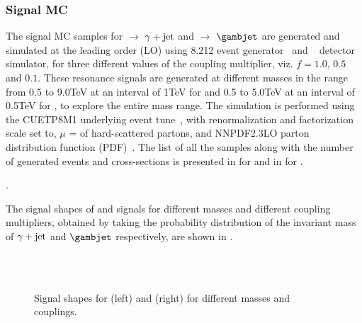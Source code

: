 \subsubsection{Signal MC}
The signal MC samples for \qstar $\rightarrow$ $\gamma+\mathrm{jet}$ and \bstar $\rightarrow$ $\gambjet$ are generated and simulated at the leading order (LO)
using {\pythia} 8.212 event generator~\cite{Sjostrand:2014zea} and \geant~\cite{Agostinelli:2002hh} detector simulator,
for three different values of the coupling multiplier,
viz. $f = 1.0$, $0.5$ and $0.1$. These resonance signals are generated at different
masses in the range from 0.5 to 9.0\unit{TeV} at an interval of 1\unit{TeV} for \qstar and 0.5 to 5.0\unit{TeV} at an interval of 0.5\unit{TeV} for \bstar,
to explore the entire mass range. The simulation is performed using the CUETP8M1 underlying event tune~\cite{Khachatryan:2015pea, Skands:2014pea},
with renormalization and factorization scale set to, $\mu$ = \pt of hard-scattered partons, and NNPDF2.3LO parton distribution function (PDF)~\cite{Ball:2012cx}.
The list of all the samples along with the number of generated events and cross-sections is presented in \tab{\ref{Table:QstarSigSamples}} for \qstar and in
\tab{\ref{Table:BstarSigSamples}} for \bstar.
\vspace{1.45in}

\clearpage
{\color{white}.}
\vspace{2in}

\clearpage

The signal shapes of \qstar and \bstar signals for different masses and different coupling multipliers,
obtained by taking the probability distribution of the invariant mass of $\gamma+\mathrm{jet}$ and $\gambjet$ respectively, are shown in \fig{\ref{fig:SigShapes}}.

\vspace{-0.2in}
\begin{figure}[h!]
\centering
 \\
 \\
 \caption{Signal shapes for \qstar (left) and \bstar (right) for different masses and couplings.}
\label{fig:SigShapes}
\end{figure}

